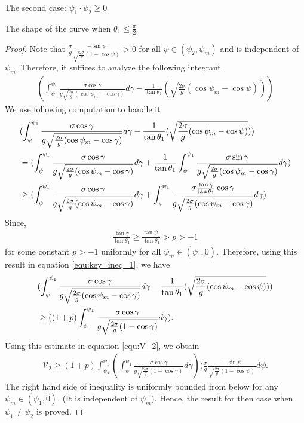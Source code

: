 \documentclass[letterpaper,reqno,10pt,twoside]{amsart}
\theoremstyle{definition}
\theoremstyle{remark}
\begin{document}
\begin{section}{The second case: $\psi_1\cdot \psi_2\geq 0$ }
\begin{subsection}{The shape of the curve when $\theta_1\leq \frac{\pi}{2}$}
\begin{proof}
        \noindent Note that $\frac{\sigma}{g}\frac{-\sin\psi}{\sqrt{\frac{2\sigma}{g}(1-\cos\psi)}}>0$ for all $\psi\in(\psi_{2},\psi_{m})$ and is independent of $\psi_{m}$. Therefore, it suffices to analyze the following integrant
        \begin{align}
            (\int_{\psi}^{\psi_{1}}\frac{\sigma\cos\gamma}{g\sqrt{\frac{2\sigma}{g}(\cos\psi_m-\cos\gamma)}}d\gamma -\frac{1}{\tan\theta_{1}}(\sqrt{\frac{2\sigma}{g}(\cos\psi_{m}-\cos\psi)}))
        \end{align}
        \noindent We use following computation to handle it
        \begin{align}{\label{equ:key_ineq_1}}
            &(\int_{\psi}^{\psi_{1}}\frac{\sigma\cos\gamma}{g\sqrt{\frac{2\sigma}{g}(\cos\psi_m-\cos\gamma)}}d\gamma -\frac{1}{\tan\theta_{1}}(\sqrt{\frac{2\sigma}{g}(\cos\psi_{m}-\cos\psi)}))\notag\\
            &=(\int_{\psi}^{\psi_{1}}\frac{\sigma\cos\gamma}{g\sqrt{\frac{2\sigma}{g}(\cos\psi_m-\cos\gamma)}}d\gamma +\frac{1}{\tan\theta_{1}}\int_{\psi}^{\psi_{1}}\frac{\sigma \sin \gamma}{g\sqrt{\frac{2\sigma}{g}(\cos\psi_{m}-\cos\gamma)}} d\gamma)\notag\\
            &\geq (\int_{\psi}^{\psi_{1}}\frac{\sigma\cos\gamma}{g\sqrt{\frac{2\sigma}{g}(\cos\psi_m-\cos\gamma)}}d\gamma +\int_{\psi}^{\psi_{1}}\frac{\sigma \frac{\tan\gamma}{\tan\theta_{1}} \cos \gamma}{g\sqrt{\frac{2\sigma}{g}(\cos\psi_{m}-\cos\gamma)}} d\gamma)
        \end{align}
        \noindent Since,
        \begin{align}
            \frac{\tan\gamma}{\tan\theta_{1}}\geq \frac{\tan\psi_{1}}{\tan\theta_{1}}>p>-1
        \end{align}
        \noindent for some constant $p>-1$ uniformly for all $\psi_{m}\in(\psi_{1},0)$. Therefore, using this result in equation \eqref{equ:key_ineq_1}, we have
        \begin{align}
            &(\int_{\psi}^{\psi_{1}}\frac{\sigma\cos\gamma}{g\sqrt{\frac{2\sigma}{g}(\cos\psi_m-\cos\gamma)}}d\gamma -\frac{1}{\tan\theta_{1}}(\sqrt{\frac{2\sigma}{g}(\cos\psi_{m}-\cos\psi)}))\notag\\
            &\geq ((1+p)\int_{\psi}^{\psi_{1}}\frac{\sigma\cos\gamma}{g\sqrt{\frac{2\sigma}{g}(1-\cos\gamma)}}d\gamma ).
        \end{align}
        \noindent Using this estimate in equation \eqref{equ:V_2}, we obtain
        \begin{align}
            \mathscr{V}_{2}\geq (1+p)\int_{\psi_{2}}^{\psi_{1}}(\int_{\psi}^{\psi_{1}}\frac{\sigma\cos\gamma}{g\sqrt{\frac{2\sigma}{g}(1-\cos\gamma)}}d\gamma))\frac{\sigma}{g}\frac{-\sin\psi}{\sqrt{\frac{2\sigma}{g}(1-\cos\psi)}}d\psi.
        \end{align}
        The right hand side of inequality is uniformly bounded from below for any $\psi_{m}\in (\psi_{1},0)$. (It is independent of $\psi_{m}$). Hence, the result for then case when $\psi_{1}\neq \psi_{2}$ is proved.


\end{proof}
\end{subsection}
\end{section}
\end{document}
